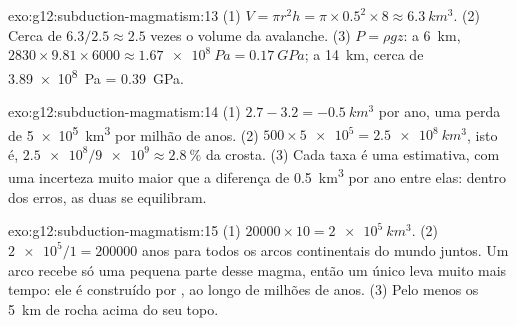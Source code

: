 \begin{solution}{exo:g12:subduction-magmatism:13}
(1) $V = \pi r^2 h = \pi \times 0.5^2 \times 8 \approx \qty{6.3}{km^3}$.
(2) Cerca de $6.3/2.5 \approx 2.5$ vezes o volume da avalanche.
(3) $P = \rho g z$: a \qty{6}{km}, $2830 \times 9.81 \times 6000 \approx
\qty{1.67e8}{Pa} = \qty{0.17}{GPa}$; a \qty{14}{km}, cerca de
\qty{3.89e8}{Pa} = \qty{0.39}{GPa}.
\end{solution}

\begin{solution}{exo:g12:subduction-magmatism:14}
(1) $2.7 - 3.2 = \qty{-0.5}{km^3}$ por ano, uma perda de \qty{5e5}{km^3} por
milhão de anos. (2) $500 \times \num{5e5} = \qty{2.5e8}{km^3}$, isto é,
$\num{2.5e8}/\num{9e9} \approx \qty{2.8}{\percent}$ da crosta. (3) Cada taxa
é uma estimativa, com uma incerteza muito maior que a diferença de
\qty{0.5}{km^3} por ano entre elas: dentro dos erros, as duas se equilibram.
\end{solution}

\begin{solution}{exo:g12:subduction-magmatism:15}
(1) $\num{20000} \times 10 = \qty{2e5}{km^3}$. (2) $\num{2e5}/1 =
\num{200000}$ anos para todos os arcos continentais do mundo juntos. Um arco
recebe só uma pequena parte desse magma, então um único  leva muito
mais tempo: ele é construído  por , ao longo de milhões de anos.
(3) Pelo menos os \qty{5}{km} de rocha acima do seu topo.
\end{solution}

